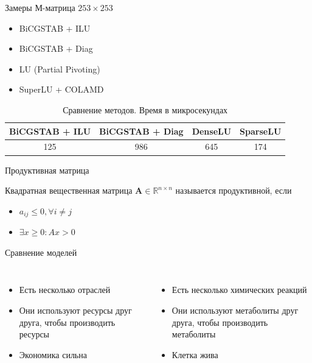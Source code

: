 \documentclass[aspectratio=169]{beamer}
\begin{document}
\begin{frame}{Замеры}
М-матрица $253 \times 253$
\begin{itemize}
	\item BiCGSTAB + ILU
	\item BiCGSTAB + Diag
	\item LU (Partial Pivoting)
	\item SuperLU + COLAMD
\end{itemize}
\begin{table}[b]
	\centering
	\caption{Сравнение методов. Время в микросекундах\label{methods_benchmark}}
	\begin{tabular}{c|c|c|c}
		\hline
		BiCGSTAB + ILU & BiCGSTAB + Diag & DenseLU & SparseLU\\
		\hline
		125 & 986 & 645 & 174\\
	\end{tabular}
\end{table}
\end{frame}

\begin{frame}{Продуктивная матрица}
\begin{theorem}[Леонтьев, 1928]
	Квадратная вещественная матрица $\mathbf{A} \in \mathbb{R}^{n \times n}$ называется продуктивной, если
	\begin{itemize}
		\item $a_{ij} \leq 0, \forall i \neq j$
		\item $\exists x \geq 0 : Ax > 0$
	\end{itemize}
\end{theorem}
\end{frame}

\begin{frame}{Сравнение моделей}
\begin{columns}[T]
	\begin{itemize}
		\item Есть несколько отраслей
		\item Они используют ресурсы друг друга, чтобы производить ресурсы
		
		
		\item Экономика сильна
	\end{itemize}

	\begin{itemize}
		\item Есть несколько химических реакций
		\item Они используют метаболиты друг друга, чтобы производить метаболиты
		\item Клетка жива
	\end{itemize}
\end{columns}
\end{frame}
\end{document}
